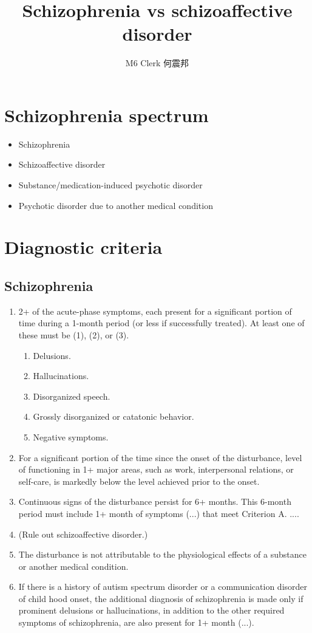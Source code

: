 \documentclass{article}
\title{Schizophrenia vs schizoaffective disorder}
\author{M6 Clerk 何震邦}
\begin{document}
\maketitle
\section{Schizophrenia spectrum}
\begin{itemize}
    \item Schizophrenia
    \item Schizoaffective disorder
    \item Substance/medication-induced psychotic disorder
    \item Psychotic disorder due to another medical condition
\end{itemize}

\section{Diagnostic criteria}
\renewcommand{\theenumi}{\Alph{enumi}}
\renewcommand{\theenumii}{\arabic{enumii}}
\subsection{Schizophrenia}
\begin{enumerate}
    \item 2+ of the acute-phase symptoms, each present for a significant
        portion of time during a 1-month period (or less if successfully
        treated).  At least one of these must be (1), (2), or (3).
        \begin{enumerate}
            \item Delusions.
            \item Hallucinations.
            \item Disorganized speech.
            \item Grossly disorganized or catatonic behavior.
            \item Negative symptoms.
        \end{enumerate}
    \item For a significant portion of the time since the onset of the
        disturbance, level of functioning in 1+ major areas, such
        as work, interpersonal relations, or self-care, is markedly below
        the level achieved prior to the onset.
    \item Continuous signs of the disturbance persist for 6+ months. This
        6-month period must include 1+ month of symptoms (...) that meet
        Criterion A. ....
    \item (Rule out schizoaffective disorder.)
    \item The disturbance is not attributable to the physiological effects
        of a substance or another medical condition.
    \item If there is a history of autism spectrum disorder or a
        communication disorder of child­ hood onset, the additional diagnosis
        of schizophrenia is made only if prominent delusions or
        hallucinations, in addition to the other required symptoms of
        schizophrenia, are also present for 1+ month (...).
\end{enumerate}
\end{document}
